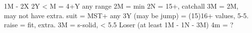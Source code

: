 1M - 2X
2Y < M = 4+Y any range
2M = min
2N = 15+, catchall
    3M = 2M, may not have extra. suit = MST+
any 3Y (may be jump) = (15)16+ values, 5-5.
raise = fit, extra.
3M = s-solid, < 5.5 Loser (at least 1M - 1N - 3M)
    4m = ?